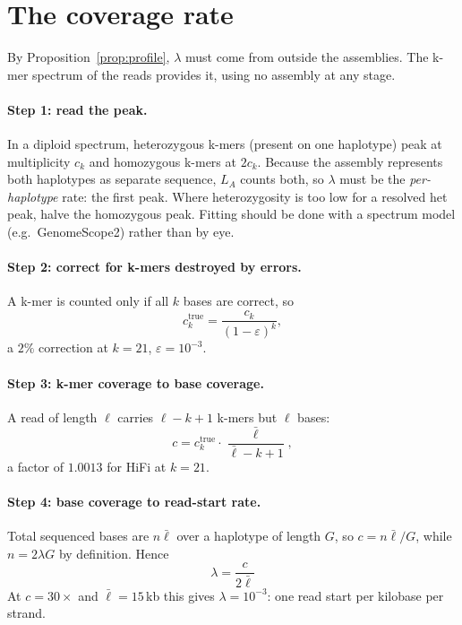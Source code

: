 \documentclass[11pt]{article}
\begin{document}
\section{The coverage rate}
\label{sec:lambda}

By Proposition~\ref{prop:profile}, $\lambda$ must come from outside the
assemblies.  The k-mer spectrum of the reads provides it, using no assembly at
any stage.

\paragraph{Step 1: read the peak.}  In a diploid spectrum, heterozygous k-mers
(present on one haplotype) peak at multiplicity $c_k$ and homozygous k-mers at
$2c_k$.  Because the assembly represents both haplotypes as separate sequence,
$L_A$ counts both, so $\lambda$ must be the \emph{per-haplotype} rate: the
first peak.  Where heterozygosity is too low for a resolved het peak, halve the
homozygous peak.  Fitting should be done with a spectrum model
(e.g.\ GenomeScope2) rather than by eye.

\paragraph{Step 2: correct for k-mers destroyed by errors.}  A k-mer is counted
only if all $k$ bases are correct, so
\begin{equation}
    c_k^{\text{true}} = \frac{c_k}{(1-\varepsilon)^k},
\end{equation}
a $2\%$ correction at $k=21$, $\varepsilon = 10^{-3}$.

\paragraph{Step 3: k-mer coverage to base coverage.}  A read of length $\ell$
carries $\ell-k+1$ k-mers but $\ell$ bases:
\begin{equation}
    c = c_k^{\text{true}}\cdot\frac{\bar\ell}{\bar\ell-k+1},
\end{equation}
a factor of $1.0013$ for HiFi at $k=21$.

\paragraph{Step 4: base coverage to read-start rate.}  Total sequenced bases are
$n\bar\ell$ over a haplotype of length $G$, so $c = n\bar\ell/G$, while
$n = 2\lambda G$ by definition.  Hence
\begin{equation}
    \boxed{\;\lambda = \frac{c}{2\bar\ell}\;}
\end{equation}
At $c=30\times$ and $\bar\ell=15$\,kb this gives $\lambda = 10^{-3}$: one read
start per kilobase per strand.
\end{document}
